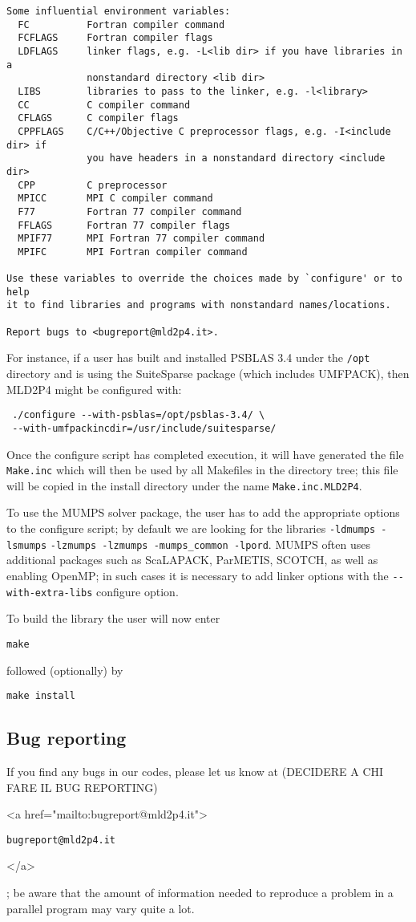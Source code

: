 \begin{verbatim}
Some influential environment variables:
  FC          Fortran compiler command
  FCFLAGS     Fortran compiler flags
  LDFLAGS     linker flags, e.g. -L<lib dir> if you have libraries in a
              nonstandard directory <lib dir>
  LIBS        libraries to pass to the linker, e.g. -l<library>
  CC          C compiler command
  CFLAGS      C compiler flags
  CPPFLAGS    C/C++/Objective C preprocessor flags, e.g. -I<include dir> if
              you have headers in a nonstandard directory <include dir>
  CPP         C preprocessor
  MPICC       MPI C compiler command
  F77         Fortran 77 compiler command
  FFLAGS      Fortran 77 compiler flags
  MPIF77      MPI Fortran 77 compiler command
  MPIFC       MPI Fortran compiler command

Use these variables to override the choices made by `configure' or to help
it to find libraries and programs with nonstandard names/locations.

Report bugs to <bugreport@mld2p4.it>.
\end{verbatim}
For instance, if a user has built and installed PSBLAS 3.4 under the
\verb|/opt| directory and is
using the SuiteSparse package (which includes UMFPACK), then MLD2P4
might be configured with:
\begin{verbatim}
 ./configure --with-psblas=/opt/psblas-3.4/ \
 --with-umfpackincdir=/usr/include/suitesparse/
\end{verbatim}
Once the configure script has completed execution, it will have
generated the file \verb|Make.inc| which will then be used by all
Makefiles in the directory tree; this file will be copied in the
install directory under the name \verb|Make.inc.MLD2P4|.

To use the MUMPS solver package, 
the user has to add the appropriate options to the configure script;
by default we are looking for the libraries
\verb|-ldmumps -lsmumps| \verb|-lzmumps -lzmumps -mumps_common -lpord|.
MUMPS often uses additional packages such as ScaLAPACK, ParMETIS,
SCOTCH, as well as enabling OpenMP; in such cases it is necessary to
add linker options with the \verb|--with-extra-libs| configure option.

To build the library the user will now enter 
\begin{verbatim}
make
\end{verbatim}
followed (optionally) by 
\begin{verbatim}
make install
\end{verbatim}
\subsection{Bug reporting}
If you find any bugs in our codes, please let us know at (DECIDERE A CHI FARE IL BUG REPORTING)
\begin{rawhtml}
<a href="mailto:bugreport@mld2p4.it">
\end{rawhtml}
\texttt{bugreport@mld2p4.it}
\begin{rawhtml}
</a>
\end{rawhtml}
; be aware that  
the amount of information needed to reproduce a problem in a parallel
program may vary quite a lot. 
